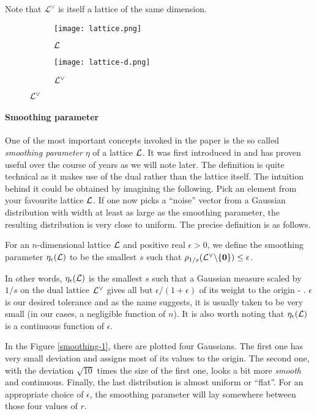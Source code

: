 Note that $\mathcal{L}^{\vee}$ is itself a lattice of the same dimension.
\begin{figure}[ht]
	\caption{Lattice $\Ll$ from example \ref{ld-ex} and its dual.}
        \label{lattices}
        \centering
        \begin{subfigure}{.5\textwidth} 
                \centering
                \texttt{[image: lattice.png]}
                \caption{$\Ll$}
        \end{subfigure}%
        \begin{subfigure}{.5\textwidth}
                \centering
                \texttt{[image: lattice-d.png]}
                \caption{$\mathcal{L}^{\vee}$}
        \end{subfigure}
\end{figure}


\paragraph{Smoothing parameter}
One of the most important concepts invoked in the paper is the so called \textit{smoothing parameter} $\eta$ of a lattice $\Ll$. It was first introduced in \cite{smoothing} and has proven useful over the course of years as we will note later. The definition is quite technical as it makes use of the dual rather than the lattice itself. The intuition behind it could be obtained by imagining the following. Pick an element from your favourite lattice $\Ll$. If one now picks a ``noise'' vector from a Gaussian distribution with width at least as large as the smoothing parameter, the resulting distribution is very close to uniform. The precise definition is as follows.
\begin{definition}\label{smoothing}
	For an $n$-dimensional lattice $\Ll$ and positive real $\epsilon > 0$, we define the smoothing parameter $\eta_{\epsilon}(\mathcal{L})$ to be the smallest $s$ such that $\rho_{1/s}(\mathcal{L}^{\vee} \backslash \{\boldsymbol{0}\}) \leq \epsilon$.
\end{definition}
In other words, $\eta_{\epsilon}(\mathcal{L})$ is the smallest $s$ such that a Gaussian measure scaled by $1/s$ on the dual lattice $\mathcal{L}^{\vee}$ gives all but $\epsilon/(1+\epsilon)$ of its weight to the origin - \cite{regev}. $\epsilon$ is our desired tolerance and as the name suggests, it is usually taken to be very small (in our cases, a negligible function of $n$). It is also worth noting that $\eta_{\epsilon}(\mathcal{L})$ is a continuous function of $\epsilon$. 

In the Figure \ref{smoothing-1}, there are plotted four Gaussians. The first one has very small deviation and assigns most of its values to the origin. The second one, with the deviation $\sqrt{10}$ times the size of the first one, looks a bit more \textit{smooth} and continuous. Finally, the last distribution is almost uniform or ``flat''. For an appropriate choice of $\epsilon$, the smoothing parameter will lay somewhere between those four values of $r$.

